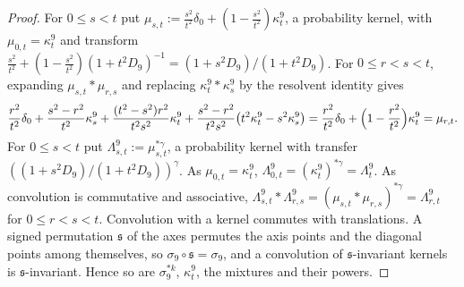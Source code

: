 \begin{proof}
For $0 \le s < t$ put $\mu_{s,t} := \tfrac{s^2}{t^2}\delta_0 + (1 - \tfrac{s^2}{t^2})\kappa^9_t$, a
probability kernel, with $\mu_{0,t} = \kappa^9_t$ and transform
$\tfrac{s^2}{t^2} + (1 - \tfrac{s^2}{t^2})(1 + t^2D_9)^{-1} = (1 + s^2D_9)/(1 + t^2D_9)$. For
$0 \le r < s < t$, expanding $\mu_{s,t} * \mu_{r,s}$ and replacing $\kappa^9_t * \kappa^9_s$ by the
resolvent identity gives
\[
  \frac{r^2}{t^2}\delta_0 + \frac{s^2 - r^2}{t^2}\kappa^9_s + \frac{(t^2 - s^2)r^2}{t^2s^2}\kappa^9_t
  + \frac{s^2 - r^2}{t^2s^2}\bigl(t^2\kappa^9_t - s^2\kappa^9_s\bigr)
  = \frac{r^2}{t^2}\delta_0 + \Bigl(1 - \frac{r^2}{t^2}\Bigr)\kappa^9_t = \mu_{r,t} .
\]
For $0 \le s < t$ put $\Lambda^9_{s,t} := \mu_{s,t}^{*\gamma}$, a probability kernel with transfer
$((1 + s^2D_9)/(1 + t^2D_9))^\gamma$. As $\mu_{0,t} = \kappa^9_t$, $\Lambda^9_{0,t} = (\kappa^9_t)^{*\gamma}
= \Lambda^9_t$. As convolution is commutative and associative,
$\Lambda^9_{s,t} * \Lambda^9_{r,s} = (\mu_{s,t} * \mu_{r,s})^{*\gamma} = \Lambda^9_{r,t}$ for
$0 \le r < s < t$. Convolution with a kernel commutes with
translations. A signed permutation $\mathfrak{s}$ of the axes permutes the axis points and the
diagonal points among themselves, so $\sigma_9\circ\mathfrak{s} = \sigma_9$, and a convolution of
$\mathfrak{s}$-invariant kernels is $\mathfrak{s}$-invariant. Hence so are $\sigma_9^{*k}$, $\kappa^9_t$,
the mixtures and their powers.
\end{proof}
